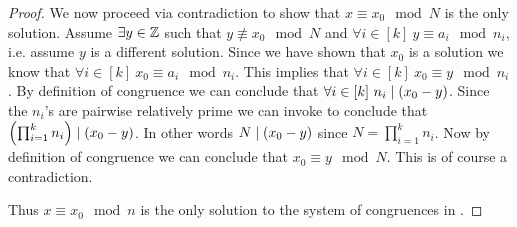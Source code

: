 \begin{proof}
            We now proceed via contradiction to show that $x \equiv x_0 \mod N$ is the only solution.
            Assume $\exists y \in \mathbb{Z}$ such that $y \not\equiv x_0 \mod N$ and 
            $\forall i \in [k] \ y \equiv a_i \mod n_i$, i.e. assume $y$ is a different solution. 
            Since we have shown that $x_0$
            is a solution we know that $\forall i \in [k] \ x_0 \equiv a_i \mod n_i$.
            This implies that $\forall i \in [k] \ x_0 \equiv y \mod n_i$. By definition
            of congruence we can conclude that $\forall i \in [k] \ n_i \mid (x_0 - y)$.
            Since the $n_i$'s are pairwise relatively prime we can invoke
             to conclude that
            $\left(\prod_{i = 1}^{k} n_i\right) \mid (x_0 - y)$.
            In other words $N \mid (x_0 - y)$ since $N = \prod_{i = 1}^{k} n_i$.
            Now by definition of congruence we can conclude that $x_0 \equiv y \mod N$.
            This is of course a contradiction.

            Thus $x \equiv x_0 \mod n$ is the only solution to
            the system of congruences in . \QED
        \end{proof}
